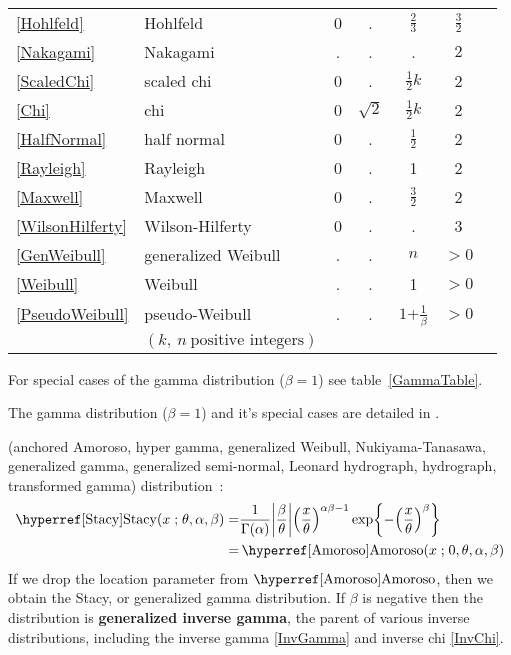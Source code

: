 \begin{table}[tp]
\begin{center}
{\begin{tabular}{llccccl}
\eqref{Hohlfeld} & Hohlfeld & 0 & . & $\tfrac{2}{3}$ & $\tfrac{3}{2}$ \\
\eqref{Nakagami} & Nakagami & . & . & . & $2$ \\
\eqref{ScaledChi} &scaled chi& 0 & . & $\tfrac{1}{2}k$  & 2  \\
\eqref{Chi} & chi & 0 & $\sqrt{2}$ & $\tfrac{1}{2}k$ & 2 \\
\eqref{HalfNormal} & half normal & 0 & . & $\tfrac{1}{2}$ & 2 & \\  
\eqref{Rayleigh} & Rayleigh & 0 & . & 1 & 2  \\
\eqref{Maxwell} & Maxwell& 0 & . & $\frac{3}{2}$  & 2  \\
\eqref{WilsonHilferty} &Wilson-Hilferty& 0 & . & .  & 3  \\
\eqref{GenWeibull} & generalized Weibull  & . & . & $n$ & $>\!\!0$  \\
\eqref{Weibull} & Weibull & . & . & 1 &  $>\!\!0$  \\
\eqref{PseudoWeibull} & pseudo-Weibull & . & . & $1$+$\tfrac{1}{\beta}$ &  $>\!\!0$
 \\
  & $(k,\ n\ \text{positive integers})$
 \end{tabular} 
}
\end{center}
For special cases of the gamma distribution ($\beta=1$) see table~\ref{GammaTable}.

\end{table}





The gamma distribution ($\beta=1$) and it's special cases are detailed in .

 (anchored Amoroso, hyper gamma, generalized Weibull, Nukiyama-Tanasawa, generalized gamma, generalized semi-normal, Leonard hydrograph, hydrograph,  transformed gamma)  distribution~\cite{Stacy1962,Dadpay2007}:
\begin{align}
\label{Stacy}
\opr{Stacy}(x \given \theta, \alpha, \beta) 
=& \frac{1}{\Gamma(\alpha)} \Left|\frac{\beta}{\theta}\Right| \Left(\frac{x}{\theta}\Right)^{\alpha\beta-1} 
\exp \Left\{ -\Left(\frac{x}{\theta}\Right)^{\beta} \Right\} \checked
\\=&  \opr{Amoroso}(x\given  0, \theta, \alpha, \beta) \notag \checked
\end{align}
If we drop the location parameter from $\opr{Amoroso}$, then we obtain the 
Stacy, or generalized gamma distribution.
If $\beta$ is negative then the distribution is  {\bf generalized inverse gamma}, the parent of various inverse distributions, including the inverse gamma \eqref{InvGamma} and inverse chi \eqref{InvChi}. 

